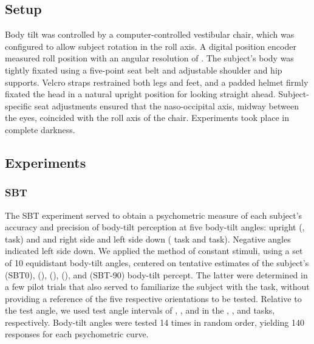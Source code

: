 \subsection{Setup}

Body tilt was controlled by a computer-controlled vestibular chair, which was configured to allow subject rotation in the roll axis. A digital position encoder measured roll position with an angular resolution of . The subject's body was tightly fixated using a five-point seat belt and adjustable shoulder and hip supports. Velcro straps restrained both legs and feet, and a padded helmet firmly fixated the head in a natural upright position for looking straight ahead. Subject-specific seat adjustments ensured that the naso-occipital axis, midway between the eyes, coincided with the roll axis of the chair. Experiments took place in complete darkness. 

\subsection{Experiments}
\label{p1:sec:experiments}

\subsubsection{SBT}
\label{p1:sec:methods_sbt}
 
The SBT experiment served to obtain a psychometric measure of each subject's accuracy and precision of body-tilt perception at five body-tilt angles: upright (,  task) and  and  right side and left side down ( task and  task). Negative angles indicated left side down. We applied the method of constant stimuli, using a set of 10 equidistant body-tilt angles, centered on tentative estimates of the subject's  (SBT0),  (),  (),  (), and  (SBT-90) body-tilt percept. The latter were determined in a few pilot trials that also served to familiarize the subject with the task, without providing a reference of the five respective orientations to be tested. Relative to the test angle, we used test angle intervals of , , and  in the , , and  tasks, respectively. Body-tilt angles were tested 14 times in random order, yielding 140 responses for each psychometric curve. 

